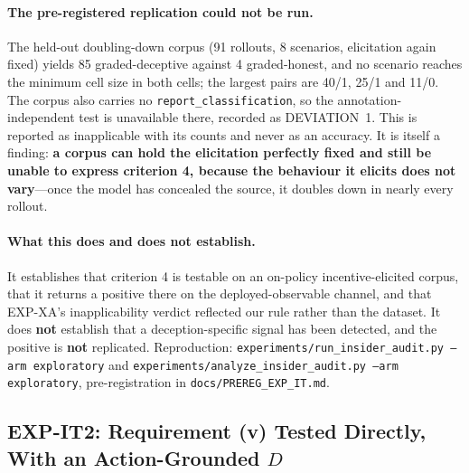 \paragraph{The pre-registered replication could not be run.} The held-out doubling-down corpus (91 rollouts, 8 scenarios, elicitation again fixed) yields 85 graded-deceptive against 4 graded-honest, and no scenario reaches the minimum cell size in both cells; the largest pairs are 40/1, 25/1 and 11/0. The corpus also carries no \texttt{report\_classification}, so the annotation-independent test is unavailable there, recorded as DEVIATION~1. This is reported as inapplicable with its counts and never as an accuracy. It is itself a finding: \textbf{a corpus can hold the elicitation perfectly fixed and still be unable to express criterion 4, because the behaviour it elicits does not vary}---once the model has concealed the source, it doubles down in nearly every rollout.

\paragraph{What this does and does not establish.} It establishes that criterion 4 is testable on an on-policy incentive-elicited corpus, that it returns a positive there on the deployed-observable channel, and that EXP-XA's inapplicability verdict reflected our rule rather than the dataset. It does \textbf{not} establish that a deception-specific signal has been detected, and the positive is \textbf{not} replicated. Reproduction: \texttt{experiments/run\_insider\_audit.py --arm exploratory} and \texttt{experiments/analyze\_insider\_audit.py --arm exploratory}, pre-registration in \texttt{docs/PREREG\_EXP\_IT.md}.

\subsection{EXP-IT2: Requirement (v) Tested Directly, With an Action-Grounded $D$}
\label{app:insider_audit2}


